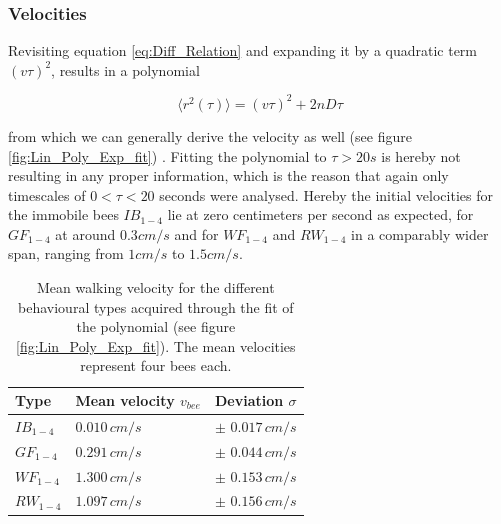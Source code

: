 \subsubsection{Velocities}

Revisiting equation \ref{eq:Diff_Relation} and expanding it by a quadratic term $(v \tau)^{2}$, results in a polynomial 

\begin{equation}
    \label{eq:Diff_Relation_poly}
    \langle r^{2}(\tau) \rangle = (v \tau)^2 + 2nD\tau
\end{equation}

from which we can generally derive the velocity as well (see figure \ref{fig:Lin_Poly_Exp_fit}) \cite{Tseng2002} \cite{Cherstvy2021}. Fitting the polynomial to $\tau>20s$ is hereby not resulting in any proper information, which is the reason that again only timescales of $0<\tau<20$ seconds were analysed. Hereby the initial velocities for the immobile bees $IB_{1-4}$ lie at zero centimeters per second as expected, for $GF_{1-4}$ at around $0.3cm/s$ and for $WF_{1-4}$ and $RW_{1-4}$ in a comparably wider span, ranging from $1cm/s$ to $1.5cm/s$.

\begin{center}
\vspace{-2mm}
\begin{table}[H]
\caption{Mean walking velocity for the different behavioural types acquired through the fit of the polynomial (see figure \ref{fig:Lin_Poly_Exp_fit}). The mean velocities represent four bees each.}
    \centering
    \begin{tabular}{p{1.2cm}|p{3.0cm}|p{4.0cm}}
         \textbf{Type} & \textbf{Mean velocity $v_{bee}$} & \textbf{Deviation $\sigma$} \\
         \hline
         \hline
         $IB_{1-4}$ & $0.010 \,cm/s$ & $\pm$ $0.017 \,cm/s$  \\
         $GF_{1-4}$ & $0.291 \,cm/s$ & $\pm$ $0.044 \,cm/s$  \\
         $WF_{1-4}$ & $1.300 \,cm/s$ & $\pm$ $0.153 \,cm/s$  \\
         $RW_{1-4}$ & $1.097 \,cm/s$ & $\pm$ $0.156 \,cm/s$  \\
    \end{tabular}
    \label{tab:vel_poly}
    \vspace{-10mm}
\end{table}
\end{center}

